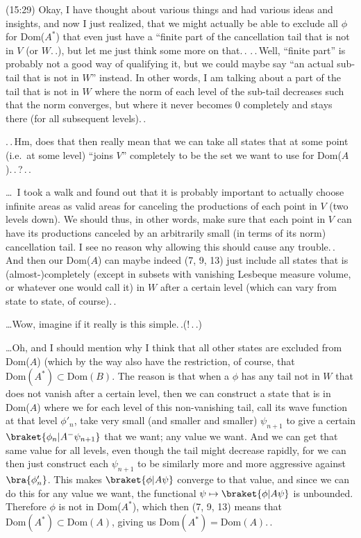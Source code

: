 \documentclass{report}
\begin{document}
(15:29) Okay, I have thought about various things and had various ideas and insights, and now I just realized, that we might actually be able to exclude all $\phi$ for Dom($A^*$) that even just have a ``finite part of the cancellation tail that is not in $V$ (or $W$.\,.), but let me just think some more on that.\,. .\,.\,Well, ``finite part'' is probably not a good way of qualifying it, but we could maybe say ``an actual sub-tail that is not in $W$'' instead. In other words, I am talking about a part of the tail that is not in $W$ where the norm of each level of the sub-tail decreases such that the norm converges, but where it never becomes 0 completely and stays there (for all subsequent levels).\,. 

.\,.\,Hm, does that then really mean that we can take all states that at some point (i.e.\ at some level) ``joins $V$'' completely to be the set we want to use for Dom($A$).\,.\,?\,.\,. %

\ldots\ I took a walk and found out that it is probably important to actually choose infinite areas as valid areas for canceling the productions of each point in $V$ (two levels down). We should thus, in other words, make sure that each point in $V$ can have its productions canceled by an arbitrarily small (in terms of its norm) cancellation tail. I see no reason why allowing this should cause any trouble.\,. And then our Dom($A$) can maybe indeed (7, 9, 13) just include all states that is (almost-)completely (except in subsets with vanishing Lesbeque measure volume, or whatever one would call it) in $W$ after a certain level (which can vary from state to state, of course).\,.  

\ldots Wow, %
imagine if it really is this simple.\,.(!\,.\,.)  

\ldots Oh, and I should mention why I think that all other states are excluded from Dom($A$) (which by the way also have the restriction, of course, that $\mathrm{Dom}(A^*)\subset\mathrm{Dom}(B)$. The reason is that when a $\phi$ has any tail not in $W$ that does not vanish after a certain level, then we can construct a state that is in Dom($A$) where we for each level of this non-vanishing tail, call its wave function at that level $\phi'_n$, take very small (and smaller and smaller) $\psi_{n+1}$ to give a certain $\braket{\phi_n | A^- \psi_{n+1}}$ that we want; any value we want. And we can get that same value for all levels, even though the tail might decrease rapidly, for we can then just construct each $\psi_{n+1}$ to be similarly more and more aggressive against $\bra{\phi'_n}$. This makes $\braket{\phi | A \psi}$ converge to that value, and since we can do this for any value we want, the functional $\psi \mapsto \braket{\phi | A \psi}$ is unbounded. Therefore $\phi$ is not in Dom($A^*$), which then (7, 9, 13) means that $\mathrm{Dom}(A^*) \subset \mathrm{Dom}(A)$, giving us $\mathrm{Dom}(A^*) = \mathrm{Dom}(A)$.\,. 
\end{document}
